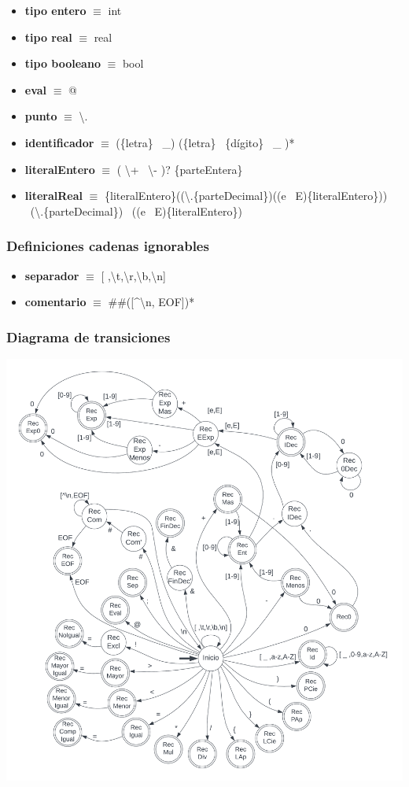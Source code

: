 \documentclass[11pt]{article}
\begin{document}
\begin{itemize}
            \item \textbf{tipo entero }$\equiv$ int
            \item \textbf{tipo real }$\equiv$ real
            \item \textbf{tipo booleano }$\equiv$ bool
            \item \textbf{eval }$\equiv$ @
            \item \textbf{punto }$\equiv$ \textbackslash.
            \item \textbf{identificador }$\equiv$ (\{letra\} \textbar\ \_) (\{letra\} \textbar\ \{dígito\} \textbar\ \_ )*
            \item \textbf{literalEntero }$\equiv$ ( \textbackslash + \textbar\ \textbackslash - )? \{parteEntera\}
            \item \textbf{literalReal }  $\equiv$ \{literalEntero\}((\textbackslash.\{parteDecimal\})((e \textbar\ E)\{literalEntero\})) \textbar\ (\textbackslash.\{parteDecimal\}) \textbar\ ((e \textbar\ E)\{literalEntero\})
        \end{itemize}
        \subsubsection*{Definiciones cadenas ignorables}
        \begin{itemize}
            \item \textbf{separador }$\equiv$ [ ,\textbackslash t,\textbackslash r,\textbackslash b,\textbackslash n]
            \item \textbf{comentario }$\equiv$ \#\#([\^{}\textbackslash n, EOF])*
        \end{itemize}
    \subsubsection{Diagrama de transiciones}
        \includegraphics[scale=0.2]{tiny0}
\end{document}
